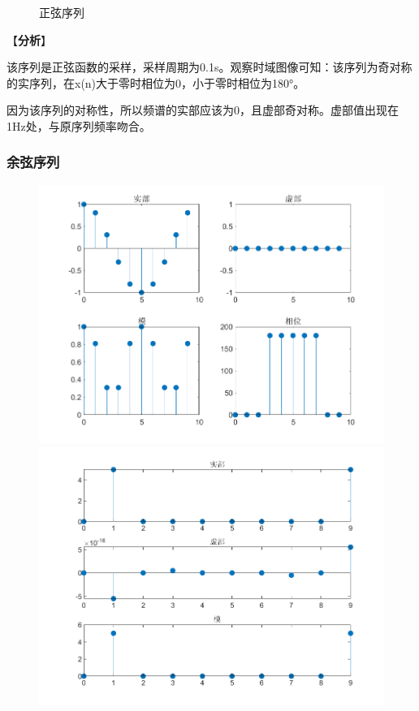 \documentclass{../source/zjureport}
\begin{document}
\begin{figure}[htbp]
\begin{minipage}[t]{0.48\textwidth}
                    \end{minipage}
                    \caption{正弦序列}
                \end{figure}
                【\textbf{分析}】

                该序列是正弦函数的采样，采样周期为0.1s。观察时域图像可知：该序列为奇对称的实序列，在x(n)大于零时相位为0，小于零时相位为180°。

                因为该序列的对称性，所以频谱的实部应该为0，且虚部奇对称。虚部值出现在1Hz处，与原序列频率吻合。
                

            \subsubsection{余弦序列}
                \begin{figure}[htbp]
                    \centering
                    \begin{minipage}[t]{0.48\textwidth}
                    \centering
                    \includegraphics[width=\textwidth]{figure/余弦序列.png}
                    \end{minipage}
                    \begin{minipage}[t]{0.48\textwidth}
                    \centering
                    \includegraphics[width=\textwidth]{figure/频谱_余弦序列.png}

\end{minipage}
\end{figure}
\end{document}
